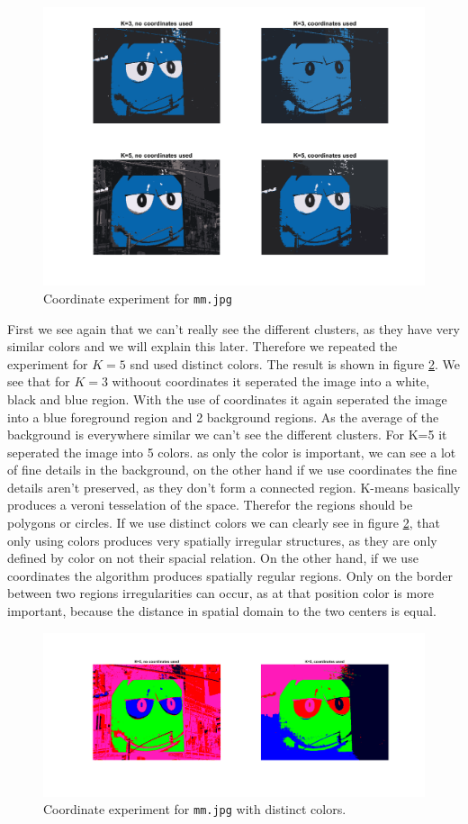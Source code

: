\begin{figure}
\includegraphics[width = 0.9\linewidth]{figures/task2/mm_coordinates.png}
\caption{Coordinate experiment for \texttt{mm.jpg}}
\label{fig:mm:coords}
\end{figure}
First we see again that we can't really see the different clusters, as they have very similar colors and we will explain this later. Therefore we repeated the experiment for $K=5$ snd used distinct colors. The result is shown in figure \ref{fig:mm:coords:distinct}. We see that for $K=3$ withoout coordinates it seperated the image into a white, black and blue region. With the use of coordinates it again seperated the image into a blue foreground region and 2 background regions. As the average of the background is everywhere similar we can't see the different clusters. For K=5 it seperated the image into 5 colors. as only the color is important, we can see a lot of fine details in the background, on the other hand if we use coordinates the fine details aren't preserved, as they don't form a connected region. K-means basically produces a veroni tesselation of the space. Therefor the regions should be polygons or circles. If we use distinct colors we can clearly see in figure \ref{fig:mm:coords:distinct}, that only using colors produces very spatially irregular structures, as they are only defined by color on not their spacial relation. On the other hand, if we use coordinates the algorithm produces spatially regular regions. Only on the border between two regions irregularities can occur, as at that position color is more important, because the distance in spatial domain to the two centers is equal.
\begin{figure}
\includegraphics[width = 0.9\linewidth]{figures/task2/mm_bad_visibility.png}
\caption{Coordinate experiment for \texttt{mm.jpg} with distinct colors.}
\label{fig:mm:coords:distinct}
\end{figure}

